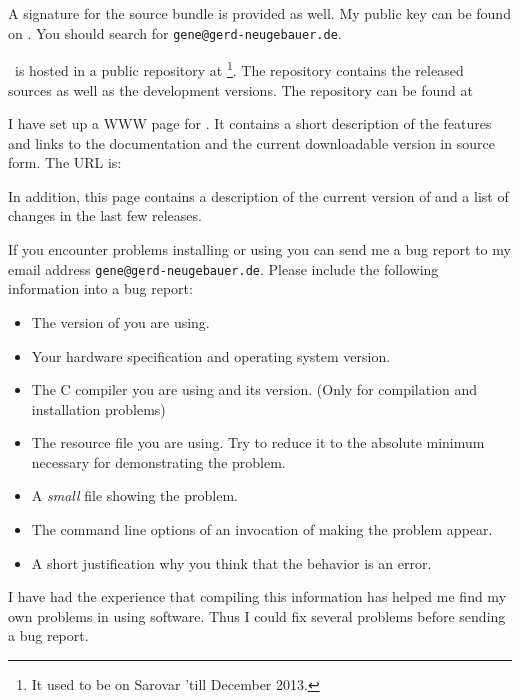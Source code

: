 \documentclass[11pt,a4paper]{scrbook}
\begin{document}
A signature for the source bundle is provided as well. My public key can be
found  on . You should search
for \texttt{gene@gerd-neugebauer.de}.

\BibTool\ is hosted in a public repository at
\footnote{It used to be on
  Sarovar 'till December 2013.}. The repository contains the released sources
as well as the development versions. The repository can be found at
\begin{quote}
\end{quote}

I have set up a WWW page for \BibTool. It contains a short description of the
features and links to the documentation and the current downloadable version
in source form. The URL is:

\begin{quote}
\end{quote}

In addition, this page contains a description of the current version of
\BibTool{} and a list of changes in the last few releases.

If you encounter problems installing or using \BibTool{} you can send me a bug
report to my email address \texttt{gene@gerd-neugebauer.de}. Please include
the following information into a bug report:
\begin{itemize}
\item The version of \BibTool{} you are using.
\item Your hardware specification and operating system version.
\item The C compiler you are using and its version. (Only for compilation and
  installation problems)
\item The resource file you are using. Try to reduce it to the absolute
  minimum necessary for demonstrating the problem.
\item A \emph{small} \BibTeX{} file showing the problem.
\item The command line options of an invocation of \BibTool{} making
  the problem appear.
\item A short justification why you think that the behavior is an error.
\end{itemize}

I have had the experience that compiling this information has helped me find
my own problems in using software. Thus I could fix several problems before
sending a bug report.
\end{document}

